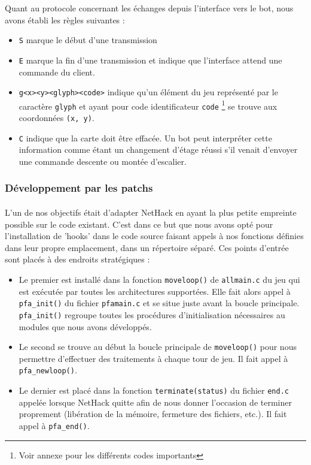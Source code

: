 \documentclass[a4paper,12pt]{article}
\begin{document}
Quant au protocole concernant les échanges depuis l'interface vers le bot,
nous avons établi les règles suivantes :
\begin{itemize}
	\item \verb!S! marque le début d'une transmission
	\item \verb!E! marque la fin d'une transmission et indique que l'interface
		attend une commande du client.
	\item \verb!g<x><y><glyph><code>! indique qu'un élément du jeu représenté
		par le caractère \verb!glyph! et ayant pour code identificateur
		\verb!code! \footnote{Voir annexe pour les différents codes
		importants} se trouve aux coordonnées \verb!(x, y)!.
	\item \verb!C! indique que la carte doit être effacée. Un bot peut
		interpréter cette information comme étant un changement d'étage réussi
		s'il venait d'envoyer une commande descente ou montée d'escalier.
\end{itemize}


\subsubsection{Développement par les patchs}

\paragraph{} L'un de nos objectifs était d'adapter NetHack en ayant la plus
petite empreinte possible sur le code existant. C'est dans ce but que nous
avons opté pour l'installation de 'hooks' dans le code source faisant appels à
nos fonctions définies dans leur propre emplacement, dans un répertoire
séparé. Ces points d'entrée sont placés à des endroits stratégiques :
\begin{itemize}
	\item Le premier est installé dans la fonction \verb!moveloop()! de
		\verb!allmain.c! du jeu qui est exécutée par toutes les architectures
		supportées. Elle fait alors appel à \verb!pfa_init()! du fichier
		\verb!pfamain.c! et se situe juste avant la boucle principale.
		\verb!pfa_init()! regroupe toutes les procédures d'initialisation
		nécessaires au modules que nous avons développés.
	\item Le second se trouve au début la boucle principale de
		\verb!moveloop()! pour nous permettre d'effectuer des traitements à
		chaque tour de jeu. Il fait appel à \verb!pfa_newloop()!.
	\item Le dernier est placé dans la fonction \verb!terminate(status)! du
		fichier \verb!end.c! appelée lorsque NetHack quitte afin de nous
		donner l'occasion de terminer proprement (libération de la mémoire,
		fermeture des fichiers, etc.). Il fait appel à \verb!pfa_end()!.
\end{itemize}
\end{document}
